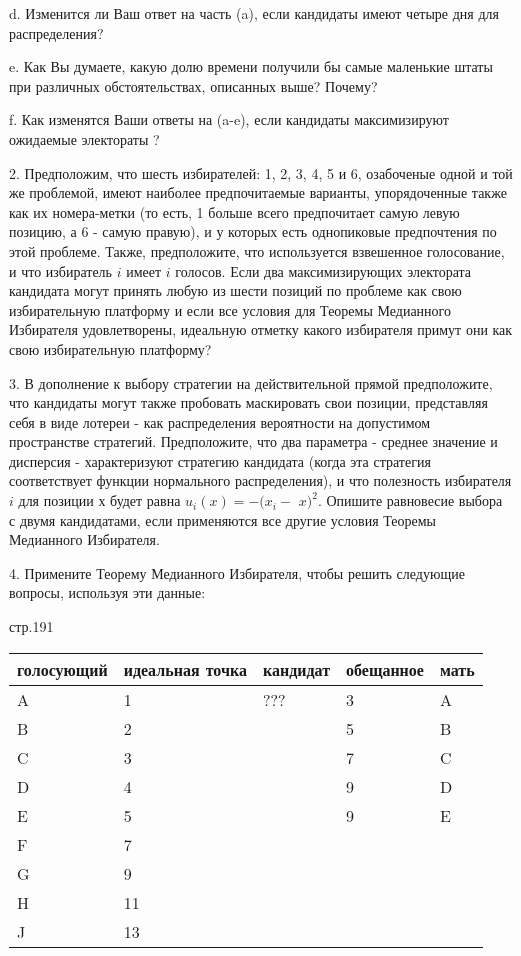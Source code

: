 \documentclass[a4paper,12pt]{article}
\begin{document}
d. Изменится ли Ваш ответ на часть (a), если
кандидаты имеют четыре дня для распределения?

e. Как Вы думаете, какую долю времени получили бы
самые маленькие штаты при различных
обстоятельствах, описанных выше? Почему?

f. Как изменятся Ваши ответы на (a-e), если
кандидаты максимизируют ожидаемые электораты ?

2. Предположим, что шесть избирателей: 1, 2, 3, 4,
5 и 6, озабоченые одной и той же проблемой, имеют
наиболее предпочитаемые варианты, упорядоченные
также как их номера-метки (то есть, 1 больше всего
предпочитает самую левую позицию, а 6 - самую
правую), и у которых есть однопиковые предпочтения
по этой проблеме. Также, предположите, что
используется взвешенное голосование, и что
избиратель $i$ имеет $i$ голосов. Если два
максимизирующих электората кандидата могут принять
любую из шести позиций по проблеме как свою
избирательную платформу и если все условия для
Теоремы Медианного Избирателя удовлетворены,
идеальную отметку какого избирателя примут они как
свою избирательную платформу?

3. В дополнение к выбору стратегии на
действительной прямой предположите, что кандидаты
могут также пробовать маскировать свои позиции,
представляя себя в виде лотереи - как распределения
вероятности на допустимом пространстве стратегий.
Предположите, что два параметра - среднее значение
и дисперсия - характеризуют стратегию кандидата
(когда эта стратегия соответствует функции
нормального распределения), и что полезность
избирателя $i$ для позиции $х $ будет равна
$u_{i}\left( x\right) =-(x_{i}-$ $x)^{2}$. Опишите
равновесие выбора с двумя кандидатами, если
применяются все другие условия Теоремы Медианного
Избирателя.

4. Примените Теорему Медианного Избирателя, чтобы
решить следующие вопросы, используя эти данные:

стр.191

\begin{tabular}{|l|l|lll}
\hline голосующий & идеальная точка & кандидат &
\multicolumn{1}{|l}{обещанное} &
\multicolumn{1}{|l|}{мать} \\ \hline
A & 1 & ??? & \multicolumn{1}{|l}{3} & \multicolumn{1}{|l|}{A} \\
B & 2 &  & \multicolumn{1}{|l}{5} & \multicolumn{1}{|l|}{B} \\
C & 3 &  & \multicolumn{1}{|l}{7} & \multicolumn{1}{|l|}{C} \\
D & 4 &  & \multicolumn{1}{|l}{9} & \multicolumn{1}{|l|}{D} \\
E & 5 &  & \multicolumn{1}{|l}{9} &
\multicolumn{1}{|l|}{E} \\ \cline{3-5}
F & 7 &  &  &  \\ G & 9 &  &  &  \\ H & 11 &  &  &  \\
J & 13 &  &  &  \\ \cline{1-2}
\end{tabular}
\end{document}
